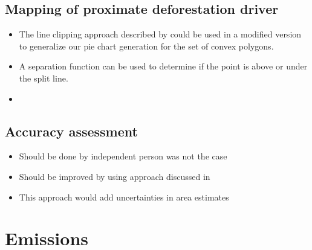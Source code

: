 		\subsection{Mapping of proximate deforestation driver}
		\label{subsec:discussion_proxy_deforestation_driver}
			\begin{itemize}
				\item The line clipping approach described by \citep{Skala1994} could be used in a modified version to generalize our pie chart generation for the set of convex polygons.
				\item A separation function can be used to determine if the point is above or under the split line.
				\item 
			\end{itemize}

		\subsection{Accuracy assessment}
		\label{subsec:discussion_accuracy_assessment}
			\begin{itemize}
				\item Should be done by independent person was not the case
				\item Should be improved by using approach discussed in \citep{Olofsson2014}
				\item This approach would add uncertainties in area estimates
			\end{itemize}

	\section{Emissions}

